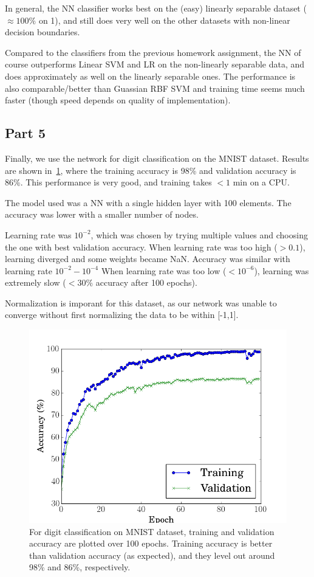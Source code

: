 In general, the NN classifier works best on the (easy) linearly separable dataset ($\approx 100\%$ on 1), and still does very well on the other datasets with non-linear decision boundaries.

Compared to the classifiers from the previous homework assignment, the NN of course outperforms Linear SVM and LR on the non-linearly separable data, and does approximately as well on the linearly separable ones. The performance is also comparable/better than Guassian RBF SVM and training time seems much faster (though speed depends on quality of implementation).

\subsection{Part 5}
Finally, we use the network for digit classification on the MNIST dataset.
Results are shown in~\cref{fig:1_5_acc}, where the training accuracy is 98\% and validation accuracy is 86\%.
This performance is very good, and training takes $<1$ min on a CPU.

The model used was a NN with a single hidden layer with 100 elements.
The accuracy was lower with a smaller number of nodes.

Learning rate was $10^{-2}$, which was chosen by trying multiple values and choosing the one with best validation accuracy.
When learning rate was too high ($>0.1$), learning diverged and some weights became NaN.
Accuracy was similar with learning rate $10^{-2} - 10^{-4}$
When learning rate was too low ($<10^{-6}$), learning was extremely slow ($<30\%$ accuracy after 100 epochs).

Normalization is imporant for this dataset, as our network was unable to converge without first normalizing the data to be within [-1,1].

\begin{figure}
	\centering
	\includegraphics [trim=0 0 0 0, clip, angle=0, width=0.8\columnwidth,
	keepaspectratio]{figures/1_5_acc}
	\caption{For digit classification on MNIST dataset, training and validation accuracy are plotted over 100 epochs. Training accuracy is better than validation accuracy (as expected), and they level out around 98\% and 86\%, respectively.} 
	\label{fig:1_5_acc} 
\end{figure}


